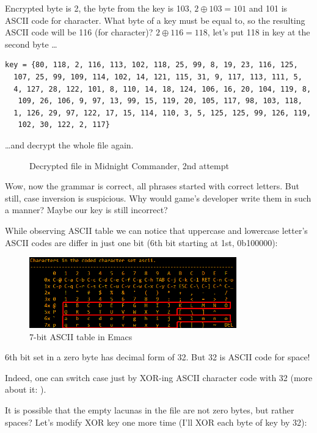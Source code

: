 Encrypted byte is 2, the byte from the key is 103, $2 \oplus 103=101$ and 101 is ASCII code for  character.
What byte of a key must be equal to, so the resulting ASCII code will be 116 (for  character)?
$2 \oplus 116=118$, let's put 118 in key at the second byte \dots

\begin{lstlisting}[style=custommath]
key = {80, 118, 2, 116, 113, 102, 118, 25, 99, 8, 19, 23, 116, 125, 
  107, 25, 99, 109, 114, 102, 14, 121, 115, 31, 9, 117, 113, 111, 5, 
  4, 127, 28, 122, 101, 8, 110, 14, 18, 124, 106, 16, 20, 104, 119, 8,
   109, 26, 106, 9, 97, 13, 99, 15, 119, 20, 105, 117, 98, 103, 118, 
  1, 126, 29, 97, 122, 17, 15, 114, 110, 3, 5, 125, 125, 99, 126, 119,
   102, 30, 122, 2, 117}
\end{lstlisting}

\dots and decrypt the whole file again.

\begin{figure}[H]
\centering
{}
\caption{Decrypted file in Midnight Commander, 2nd attempt}
\end{figure}

Wow, now the grammar is correct, all phrases started with correct letters.
But still, case inversion is suspicious.
Why would game's developer write them in such a manner?
Maybe our key is still incorrect?

While observing ASCII table we can notice that uppercase and lowercase letter's ASCII codes are differ in just one bit
(6th bit starting at 1st, 0b100000):

\begin{figure}[H]
\centering
\includegraphics[width=0.8\textwidth]{ascii.png}
\caption{7-bit \ac{ASCII} table in Emacs}
\end{figure}

6th bit set in a zero byte has decimal form of 32.
But 32 is ASCII code for space!

Indeed, one can switch case just by XOR-ing ASCII character code with 32 (more about it: ).

It is possible that the empty lacunas in the file are not zero bytes, but rather spaces?
Let's modify XOR key one more time (I'll XOR each byte of key by 32):

